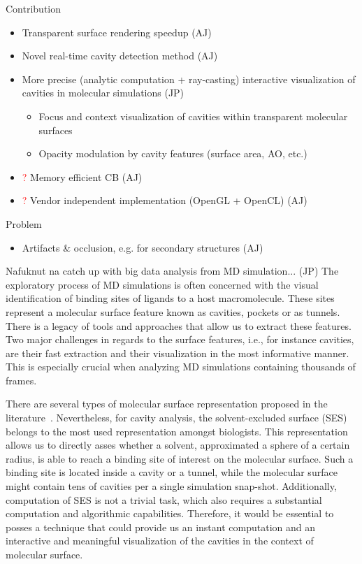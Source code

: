 Contribution
\begin{itemize}
  \item Transparent surface rendering speedup (AJ)
	\item Novel real-time cavity detection method (AJ)
	\item More precise (analytic computation + ray-casting) interactive visualization of cavities in molecular simulations (JP)
	\begin{itemize}
		\item Focus and context visualization of cavities within transparent molecular surfaces
		\item Opacity modulation by cavity features (surface area, AO, etc.)
	\end{itemize}
	\item \textcolor{red}{?} Memory efficient CB (AJ)
	\item \textcolor{red}{?} Vendor independent implementation (OpenGL + OpenCL) (AJ)
\end{itemize}

Problem
\begin{itemize}
  \item Artifacts \& occlusion, e.g. for secondary structures (AJ)
\end{itemize}

Nafuknut na catch up with big data analysis from MD simulation... (JP)
The exploratory process of MD simulations is often concerned with the visual identification of binding sites of ligands to a host macromolecule.
These sites represent a molecular surface feature known as cavities, pockets or as tunnels.
There is a legacy of tools and approaches that allow us to extract these features.
Two major challenges in regards to the surface features, i.e., for instance cavities, are their fast extraction and their visualization in the most informative manner. This is especially crucial when analyzing MD simulations containing thousands of frames.

There are several types of molecular surface representation proposed in the literature~\cite{START2015}. Nevertheless, for cavity analysis,  the solvent-excluded surface (SES) belongs to the most used representation\cite{todo} amongst biologists. This representation allows us to directly asses whether a solvent, approximated a sphere of a certain radius, is able to reach a binding site of interest on the molecular surface. Such a binding site is located inside a cavity or a tunnel, while the molecular surface might contain tens of cavities per a single simulation snap-shot. Additionally, computation of SES is not a trivial task, which also requires a substantial computation and algorithmic capabilities. Therefore, it would be essential to posses a technique that could provide us an instant computation and an interactive and meaningful visualization of the cavities in the context of molecular surface.

